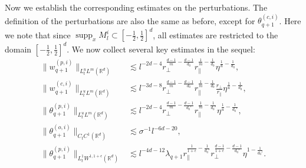 \documentclass[10pt,a4paper]{amsart}
\numberwithin{equation}{section}
\DeclareMathOperator{\supp}{supp}
\def\({{\Big(}}
\def\){{\Big)}}
\newcommand{\norm}[1]{\left\|#1\right\|}
\def\geq{\geqslant}
\def\({{\Big(}}
\def\){{\Big)}}
\def\geq{\geqslant}
\begin{document}
Now we   establish the corresponding estimates on the perturbations.  
  The definition of the perturbations are also  the same as before, except for $\theta_{q+1}^{(c,i)}$.  
 Here we note that since $\supp_x M_l^i\subset [-\frac12,\frac12]^d$, all estimates  are restricted to the domain $ [-\frac12,\frac12]^d$.
We now collect several key estimates   in the sequel:
  \begin{align*}
\|w_{q+1}^{(p,i)}\|_{L^u_tL^m(\mathbb{R}^d)}%
&\lesssim l^{-2d-4}r_\perp^{\frac{d-1}{m}-\frac{d-1}{d_0}} r_\parallel^{\frac{1}{m}-\frac{1}{d_0}}\eta^{\frac1u-\frac1{d_0}}, \\
\|w_{q+1}^{(c,i)}\|_{L^u_tL^m(\mathbb{R}^d)}%
&\lesssim l^{-3d-8}r_\perp^{\frac{d-1}{m}-\frac{d-1}{d_0}} r_\parallel^{\frac{1}{m}-\frac{1}{d_0}}\frac{r_\perp}{ r_\parallel}\eta^{\frac1u-\frac1{d_0}},\\
\|\theta_{q+1}^{(p,i)} \|_{L^u_tL^{m}(\mathbb{R}^d)}%
&\lesssim l^{-2d-4}r_\perp^{\frac{d-1}{m}-\frac{d-1}{d_0'}} r_\parallel^{\frac{1}{m}-\frac{1}{d_0'}}\eta^{\frac1u-\frac{1}{d_0'}},\\
\|\theta_{q+1}^{(o,i)}\|_{C_tC^1(\mathbb{R}^d)} 
&\lesssim \sigma^{-1} l^{-6d-20},\\%
\|\theta_{q+1}^{(p,i)}\|_{L^1_tW^{1,1+\epsilon}(\mathbb{R}^d)}%
&\lesssim l^{-4d-12}\lambda_{q+1}r_\parallel^{\frac1{1+\epsilon}-\frac{1}{d_0'}}r_\perp^{\frac{d-1}{1+\epsilon}-\frac{d-1}{d_0'}}\eta^{1-\frac1{d_0'}}.
\end{align*}
\end{document}
